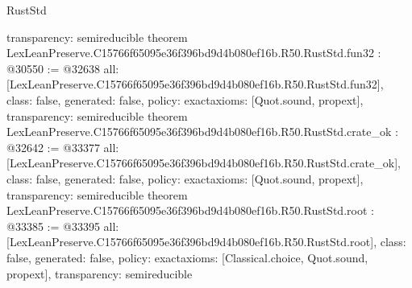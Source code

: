 \begin{lexlean}{RustStd}
\begin{coremodule}
{  transparency: semireducible
}
theorem LexLeanPreserve.C15766f65095e36f396bd9d4b080ef16b.R50.RustStd.fun32 : @30550 := @32638 {
  all: [LexLeanPreserve.C15766f65095e36f396bd9d4b080ef16b.R50.RustStd.fun32],
  class: false,
  generated: false,
  policy: exact{axioms: [Quot.sound, propext]},
  transparency: semireducible
}
theorem LexLeanPreserve.C15766f65095e36f396bd9d4b080ef16b.R50.RustStd.crate_ok : @32642 := @33377 {
  all: [LexLeanPreserve.C15766f65095e36f396bd9d4b080ef16b.R50.RustStd.crate_ok],
  class: false,
  generated: false,
  policy: exact{axioms: [Quot.sound, propext]},
  transparency: semireducible
}
theorem LexLeanPreserve.C15766f65095e36f396bd9d4b080ef16b.R50.RustStd.root : @33385 := @33395 {
  all: [LexLeanPreserve.C15766f65095e36f396bd9d4b080ef16b.R50.RustStd.root],
  class: false,
  generated: false,
  policy: exact{axioms: [Classical.choice, Quot.sound, propext]},
  transparency: semireducible
}


\end{coremodule}
\end{lexlean}
